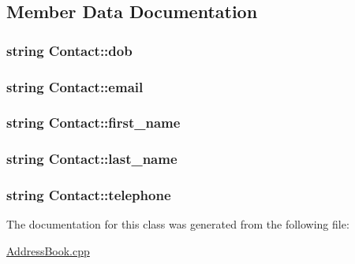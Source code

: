 \subsection{Member Data Documentation}
\subsubsection[{\texorpdfstring{dob}{dob}}]{\setlength{\rightskip}{0pt plus 5cm}string Contact\+::dob\hspace{0.3cm}{\ttfamily [private]}}\hypertarget{classContact_a50397132da5dc66f2cb289fc650c3df6}{}\label{classContact_a50397132da5dc66f2cb289fc650c3df6}
\subsubsection[{\texorpdfstring{email}{email}}]{\setlength{\rightskip}{0pt plus 5cm}string Contact\+::email\hspace{0.3cm}{\ttfamily [private]}}\hypertarget{classContact_a7cb8a0ab45d0ddc7a83df39590fcb6c1}{}\label{classContact_a7cb8a0ab45d0ddc7a83df39590fcb6c1}
\subsubsection[{\texorpdfstring{first\+\_\+name}{first_name}}]{\setlength{\rightskip}{0pt plus 5cm}string Contact\+::first\+\_\+name\hspace{0.3cm}{\ttfamily [private]}}\hypertarget{classContact_ac074ba210aa0e4a52921af8353384a59}{}\label{classContact_ac074ba210aa0e4a52921af8353384a59}
\subsubsection[{\texorpdfstring{last\+\_\+name}{last_name}}]{\setlength{\rightskip}{0pt plus 5cm}string Contact\+::last\+\_\+name\hspace{0.3cm}{\ttfamily [private]}}\hypertarget{classContact_a87032ae00ab0e8cc81d660f191bcf0fa}{}\label{classContact_a87032ae00ab0e8cc81d660f191bcf0fa}
\subsubsection[{\texorpdfstring{telephone}{telephone}}]{\setlength{\rightskip}{0pt plus 5cm}string Contact\+::telephone\hspace{0.3cm}{\ttfamily [private]}}\hypertarget{classContact_ad23a96ecf0527e8878da50da682ba794}{}\label{classContact_ad23a96ecf0527e8878da50da682ba794}


The documentation for this class was generated from the following file\+:\begin{DoxyCompactItemize}
\item 
\hyperlink{AddressBook_8cpp}{Address\+Book.\+cpp}\end{DoxyCompactItemize}
